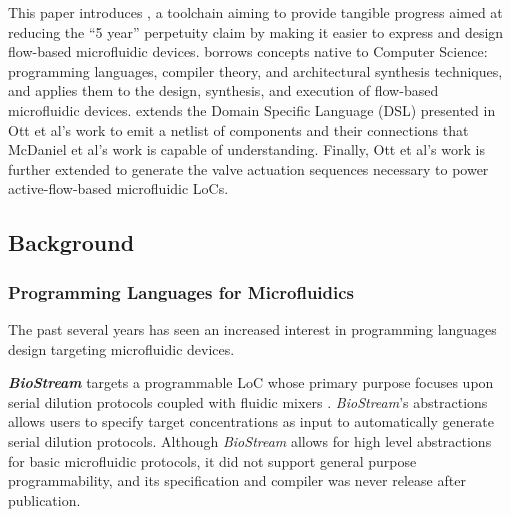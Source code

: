 This paper introduces \tool{}, a toolchain aiming to provide tangible progress aimed at reducing the ``5 year'' perpetuity claim by making it easier to express and design flow-based microfluidic devices.
\tool{} borrows concepts native to Computer Science: programming languages, compiler theory, and architectural synthesis techniques, and applies them to the design, synthesis, and execution of flow-based microfluidic devices.
\tool{} extends the Domain Specific Language (DSL) presented in Ott et al's work\cite{ott2018bioscript} to emit a netlist\cite{mcdaniel2015flow} of components and their connections that McDaniel et al's work\cite{McDaniel2013} is capable of understanding.  Finally, Ott et al's work \cite{ott2018bioscript} is further extended to generate the valve actuation sequences necessary to power active-flow-based microfluidic LoCs.

\subsection{Background}
\label{sec:background}

\subsubsection{Programming Languages for Microfluidics}
The past several years has seen an increased interest in programming languages design targeting microfluidic devices.

\textbf{\textit{BioStream}} targets a programmable LoC whose primary purpose focuses upon serial dilution protocols coupled with fluidic mixers \cite{urbanski06, ThiesMINMIX}.
\textit{BioStream}'s abstractions allows users to specify target concentrations%
as input to automatically generate serial dilution protocols.
Although 
\textit{BioStream} %
allows for high level abstractions for basic microfluidic protocols, it did not support general purpose programmability, and its specification and compiler was never release after publication.

